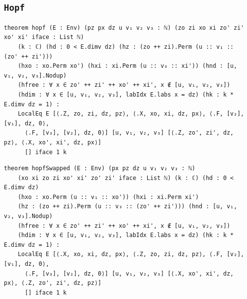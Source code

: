 \subsection{\texttt{Hopf}}
\begin{lstlisting}[style=leancore]
theorem hopf (E : Env) (pz px dz u v₁ v₂ v₃ : ℕ) (zo zi xo xi zo' zi' xo' xi' iface : List ℕ)
    (k : ℂ) (hd : 0 < E.dimv dz) (hz : (zo ++ zi).Perm (u :: v₁ :: (zo' ++ zi')))
    (hxo : xo.Perm xo') (hxi : xi.Perm (u :: v₃ :: xi')) (hnd : [u, v₁, v₂, v₃].Nodup)
    (hfree : ∀ x ∈ zo' ++ zi' ++ xo' ++ xi', x ∉ [u, v₁, v₂, v₃])
    (hdim : ∀ x ∈ [u, v₁, v₂, v₃], labIdx E.labs x = dz) (hk : k * E.dimv dz = 1) :
    LocalEq E [⟨.Z, zo, zi, dz, pz⟩, ⟨.X, xo, xi, dz, px⟩, ⟨.F, [v₂], [v₁], dz, 0⟩,
      ⟨.F, [v₃], [v₂], dz, 0⟩] [u, v₁, v₂, v₃] [⟨.Z, zo', zi', dz, pz⟩, ⟨.X, xo', xi', dz, px⟩]
      [] iface 1 k
\end{lstlisting}
\begin{lstlisting}[style=leancore]
theorem hopfSwapped (E : Env) (px pz dz u v₁ v₂ v₃ : ℕ)
    (xo xi zo zi xo' xi' zo' zi' iface : List ℕ) (k : ℂ) (hd : 0 < E.dimv dz)
    (hxo : xo.Perm (u :: v₁ :: xo')) (hxi : xi.Perm xi')
    (hz : (zo ++ zi).Perm (u :: v₃ :: (zo' ++ zi'))) (hnd : [u, v₁, v₂, v₃].Nodup)
    (hfree : ∀ x ∈ zo' ++ zi' ++ xo' ++ xi', x ∉ [u, v₁, v₂, v₃])
    (hdim : ∀ x ∈ [u, v₁, v₂, v₃], labIdx E.labs x = dz) (hk : k * E.dimv dz = 1) :
    LocalEq E [⟨.X, xo, xi, dz, px⟩, ⟨.Z, zo, zi, dz, pz⟩, ⟨.F, [v₂], [v₁], dz, 0⟩,
      ⟨.F, [v₃], [v₂], dz, 0⟩] [u, v₁, v₂, v₃] [⟨.X, xo', xi', dz, px⟩, ⟨.Z, zo', zi', dz, pz⟩]
      [] iface 1 k
\end{lstlisting}

